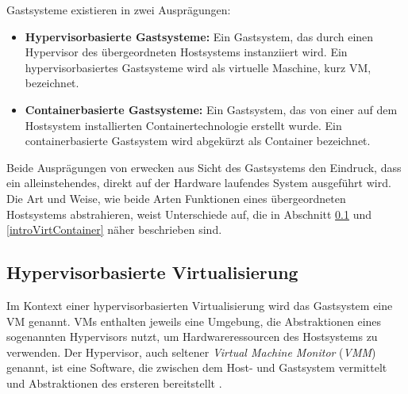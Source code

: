 \documentclass[../main.tex]{subfiles}
\begin{document}
		Gastsysteme existieren in zwei Ausprägungen:
		\begin{itemize}
			\item \textbf{Hypervisorbasierte Gastsysteme:} Ein Gastsystem, das durch einen Hypervisor des übergeordneten Hostsystems instanziiert wird. Ein hypervisorbasiertes Gastsysteme wird als virtuelle Maschine, kurz \acrshort{VM}, bezeichnet.
			\item \textbf{Containerbasierte Gastsysteme:} Ein Gastsystem, das von einer auf dem Hostsystem installierten Containertechnologie erstellt wurde. Ein containerbasierte Gastsystem wird abgekürzt als Container bezeichnet.
		\end{itemize}

		Beide Ausprägungen von erwecken aus Sicht des Gastsystems den Eindruck, dass ein alleinstehendes, direkt auf der Hardware laufendes System ausgeführt wird.	Die Art und Weise, wie beide Arten Funktionen eines übergeordneten Hostsystems abstrahieren, weist Unterschiede auf, die in Abschnitt \ref{introVirtHypervisor} und \ref{introVirtContainer} näher beschrieben sind.






    \subsection{Hypervisorbasierte Virtualisierung}
    \label{introVirtHypervisor}
      Im Kontext einer hypervisorbasierten Virtualisierung wird das Gastsystem eine \acrshort{VM} genannt. \acrshort{VM}s enthalten jeweils eine Umgebung, die Abstraktionen eines sogenannten Hypervisors nutzt, um Hardwareressourcen des Hostsystems zu verwenden. Der Hypervisor, auch seltener \emph{Virtual Machine Monitor} (\emph{VMM}) genannt, ist eine Software, die zwischen dem Host- und Gastsystem vermittelt und Abstraktionen des ersteren bereitstellt \cite[S.6]{dockerBook}\cite[S.2]{containerVirtPerformance}\cite[S.105]{tanenbaumOS}.

\end{document}

